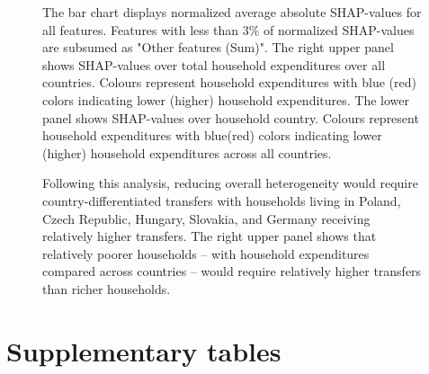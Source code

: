 \documentclass[12pt, a4paper]{article}
\newenvironment{subcaption2}
{\strut
\vspace{-5pt}
\begin{minipage}[b]{0.95\textwidth}
  \hspace*{-\parindent}
  \footnotesize}
 {\end{minipage}}
\begin{document}
\begin{refsection}
\begin{figure}[ht!]
\begin{subcaption2}
    The bar chart displays normalized average absolute SHAP-values for all features. Features with less than 3\% of normalized SHAP-values are subsumed as "Other features (Sum)". The right upper panel shows SHAP-values over total household expenditures over all countries. Colours represent household expenditures with blue (red) colors indicating lower (higher) household expenditures. The lower panel shows SHAP-values over household country. Colours represent household expenditures with blue(red) colors indicating lower (higher) household expenditures across all countries.

    Following this analysis, reducing overall heterogeneity would require country-differentiated transfers with households living in Poland, Czech Republic, Hungary, Slovakia, and Germany receiving relatively higher transfers. The right upper panel shows that relatively poorer households -- with household expenditures compared across countries -- would require relatively higher transfers than richer households.
    \end{subcaption2}
\end{figure}

\clearpage

\section{Supplementary tables} \label{sec:tables}


\clearpage


\clearpage


\clearpage


\clearpage


\clearpage


\clearpage

%   


\end{refsection}
\end{document}
